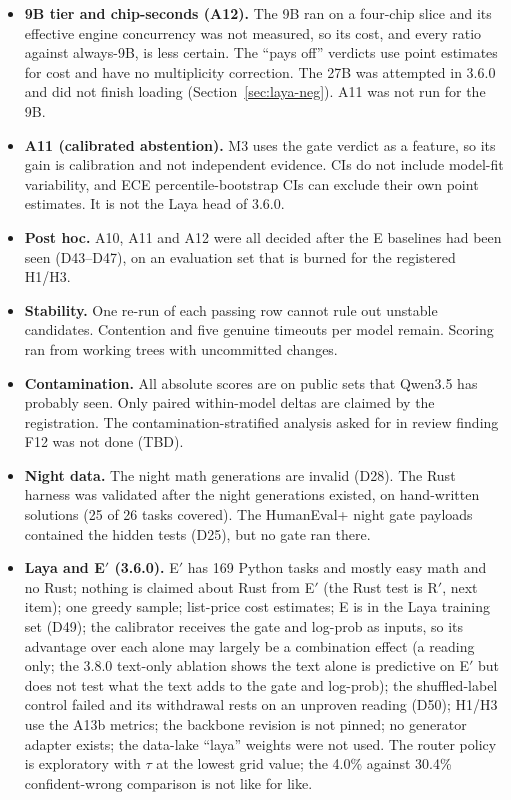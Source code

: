 \documentclass[11pt,a4paper]{article}
\newcommand{\TBD}{\textsf{TBD}}
\begin{document}
\begin{itemize}
\item \textbf{9B tier and chip-seconds (A12).} The 9B ran on a four-chip slice and its effective engine concurrency was
  not measured, so its cost, and every ratio against always-9B, is less certain. The ``pays off'' verdicts use point
  estimates for cost and have no multiplicity correction. The 27B was attempted in 3.6.0 and did not finish loading (Section~\ref{sec:laya-neg}). A11 was not run for the 9B.
\item \textbf{A11 (calibrated abstention).} M3 uses the gate verdict as a feature, so its gain is calibration and not
  independent evidence. CIs do not include model-fit variability, and ECE percentile-bootstrap CIs can exclude their own
  point estimates. It is not the Laya head of 3.6.0.
\item \textbf{Post hoc.} A10, A11 and A12 were all decided after the E baselines had been seen (D43--D47), on an
  evaluation set that is burned for the registered H1/H3.
\item \textbf{Stability.} One re-run of each passing row cannot rule out unstable candidates.
  Contention and five genuine timeouts per model remain. Scoring ran from working trees with
  uncommitted changes.
\item \textbf{Contamination.} All absolute scores are on public sets that Qwen3.5 has probably
  seen. Only paired within-model deltas are claimed by the registration. The contamination-stratified
  analysis asked for in review finding F12 was not done (\TBD).
\item \textbf{Night data.} The night math generations are invalid (D28). The Rust harness was
  validated after the night generations existed, on hand-written solutions (25 of 26 tasks covered).
  The HumanEval+ night gate payloads contained the hidden tests (D25), but no gate ran there.
\item \textbf{Laya and E$'$ (3.6.0).} E$'$ has 169 Python tasks and mostly easy math and no Rust; nothing is claimed about Rust from E$'$ (the Rust test is R$'$, next item); one greedy sample; list-price cost estimates; E is in the Laya training set (D49); the calibrator receives the gate and log-prob as inputs, so its advantage over each alone may largely be a combination effect (a reading only; the 3.8.0 text-only ablation shows the text alone is predictive on E$'$ but does not test what the text adds to the gate and log-prob); the shuffled-label control failed and its withdrawal rests on an unproven reading (D50); H1/H3 use the A13b metrics; the backbone revision is not pinned; no generator adapter exists; the data-lake ``laya'' weights were not used. The router policy is exploratory with $\tau$ at the lowest grid value; the 4.0\% against 30.4\% confident-wrong comparison is not like for like.

\end{itemize}
\end{document}
